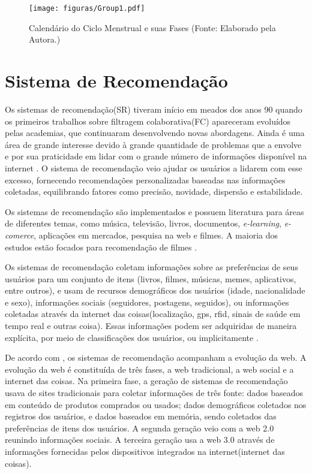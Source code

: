 \begin{figure}[h]
	\centering
	\texttt{[image: figuras/Group1.pdf]}
	\caption{Calendário do Ciclo Menstrual e suas Fases (Fonte: Elaborado pela Autora.)}
        \label{fig02}
\end{figure}


\section{Sistema de Recomendação}
 
Os sistemas de recomendação(SR) tiveram início em meados dos anos 90 
quando os primeiros trabalhos sobre filtragem colaborativa(FC) 
apareceram \cite{felferning2008} evoluídos pelas academias, 
que continuaram desenvolvendo novas abordagens. 
Ainda é uma área de grande interesse devido à grande quantidade de 
problemas que a envolve e por sua praticidade em lidar com o grande 
número de informações disponível na internet \cite{adomavicius2005}. 
O sistema de recomendação veio ajudar os usuários a lidarem com esse 
excesso, fornecendo recomendações personalizadas baseadas nas informações 
coletadas, equilibrando fatores como precisão, novidade, dispersão e 
estabilidade\cite{bobadilla2013}.


Os sistemas de recomendação são implementados e possuem literatura 
para áreas de diferentes temas, como música, televisão, livros, 
documentos, \emph{e-learning}, \emph{e-comerce}, aplicações em mercados, 
pesquisa na web e filmes. A maioria dos estudos estão focados 
para recomendação de filmes \cite{bobadilla2013}.
 
Os sistemas de recomendação coletam informações sobre as preferências 
de seus usuários para um conjunto de itens (livros, filmes, músicas, 
memes, aplicativos, entre outros), e usam de recursos demográficos dos 
usuários (idade, nacionalidade e sexo), informações sociais 
(seguidores, postagens, seguidos), ou informações coletadas através da 
internet das coisas(localização, gps, rfid, sinais de saúde em tempo 
real e outras coisa). Essas informações podem ser adquiridas de maneira 
explícita, por meio de classificações dos usuários, ou implicitamente 
\cite{bobadilla2013}.

De acordo com , os sistemas de recomendação 
acompanham a evolução da web. A evolução da web é constituída de três 
fases, a web tradicional, a web social e a internet das coisas. 
Na primeira fase, a geração de sistemas de recomendação usava de 
sites tradicionais para coletar informações de três fonte: dados 
baseados em conteúdo de produtos comprados ou usados; dados 
demográficos coletados nos registros dos usuários, e dados baseados em 
memória, sendo coletados das preferências de itens dos usuários. A segunda 
geração veio com a web 2.0 reunindo informações sociais. A terceira 
geração usa a web 3.0 através de informações fornecidas pelos dispositivos 
integrados na internet(internet das coisas).

